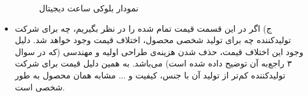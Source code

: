 \begin{itemize}
\begin{figure}[!hbpt]
		\caption{نمودار بلوکی ساعت دیجیتال}
	\end{figure}
	\item ج) 
	اگر در این قسمت قیمت‌ تمام شده را در نظر بگیریم، چه برای شرکت تولیدکننده چه برای تولید شخصی محصول، اختلاف قیمت وجود خواهد شد. دلیل وجود این اختلاف قیمت، حذف شدن هزینه‌ی طراحی اولیه و مهندسی (که در سوال ۳ راجع‌به آن توضیح داده شده است) می‌باشد. به همین دلیل قیمت برای شرکت تولیدکننده کم‌تر از تولید آن با جنس، کیفیت و ... مشابه همان محصول به طور شخصی است.
	
\end{itemize}
